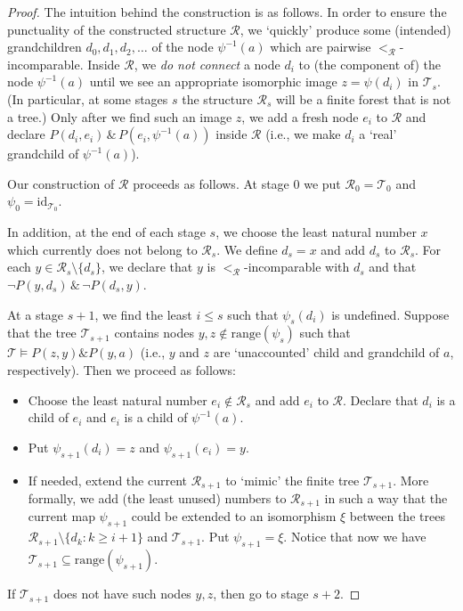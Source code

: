 \documentclass[a4paper,UKenglish,cleveref, autoref, thm-restate]{lipics-v2021}
\begin{document}
\begin{proof}
The intuition behind the construction is as follows. In order to ensure the punctuality of the constructed structure $\mathcal{R}$, we `quickly' produce some (intended) grandchildren $d_0,d_1,d_2,\ldots$ of the node $\psi^{-1}(a)$ which are pairwise $<_{\mathcal{R}}$-incomparable. Inside $\mathcal{R}$, we \emph{do not connect} a node $d_i$ to (the component of) the node $\psi^{-1}(a)$ until we see an appropriate isomorphic image $z = \psi(d_i)$ in $\mathcal{T}_s$. (In particular, at some stages $s$ the structure $\mathcal{R}_s$ will be a finite forest that is not a tree.) Only after we find such an image $z$, we add a fresh node $e_i$ to $\mathcal{R}$ and declare $P(d_i, e_i) \, \& \, P(e_i, \psi^{-1}(a))$ inside $\mathcal{R}$ (i.e., we make $d_i$ a `real' grandchild of $\psi^{-1}(a)$).

Our construction of $\mathcal{R}$ proceeds as follows. At stage $0$ we put $\mathcal{R}_0=\mathcal{T}_0$ and $\psi_0 = \mathrm{id}_{\mathcal{T}_0}$.

In addition, at the end of each stage $s$, we choose the least natural number $x$ which currently does not belong to $\mathcal{R}_s$. We define $d_s = x$ and add $d_s$ to $\mathcal{R}_s$. For each $y\in \mathcal{R}_s\setminus \{ d_s\}$, we declare that $y$ is $<_{\mathcal{R}}$-incomparable with $d_s$ and that $\neg P(y,d_s) \, \& \, \neg P(d_s,y)$.

At a stage $s+1$, we find the least $i\leq s$ such that $\psi_s(d_i)$ is undefined. 
Suppose that the tree $\mathcal{T}_{s+1}$ contains nodes $y,z\not\in \mathrm{range}(\psi_s)$ such that $\mathcal{T} \models P(z,y)\& P(y,a)$ (i.e., $y$ and $z$ are `unaccounted' child and grandchild of $a$, respectively). Then we proceed as follows:
\begin{itemize}
    \item Choose the least natural number $e_i\not\in \mathcal{R}_s$ and add $e_i$ to $\mathcal{R}$. Declare that $d_i$ is a child of $e_i$ and $e_i$ is a child of $\psi^{-1}(a)$.
    \item Put $\psi_{s+1}(d_i) = z$ and $\psi_{s+1}(e_i) = y$.
    \item If needed, extend the current $\mathcal{R}_{s+1}$ to `mimic' the finite tree $\mathcal{T}_{s+1}$.
    More formally, we add (the least unused) numbers to $\mathcal{R}_{s+1}$ in such a way that the current map $\psi_{s+1}$ could be extended to an isomorphism $\xi$ between the trees $\mathcal{R}_{s+1} \setminus \{ d_k : k\geq i+1\}$ and $\mathcal{T}_{s+1}$. Put $\psi_{s+1} = \xi$. Notice that now we have $\mathcal{T}_{s+1} \subseteq \mathrm{range}(\psi_{s+1})$.
\end{itemize}
If $\mathcal{T}_{s+1}$ does not have such nodes $y,z$, then go to stage $s+2$.


\end{proof}
\end{document}
